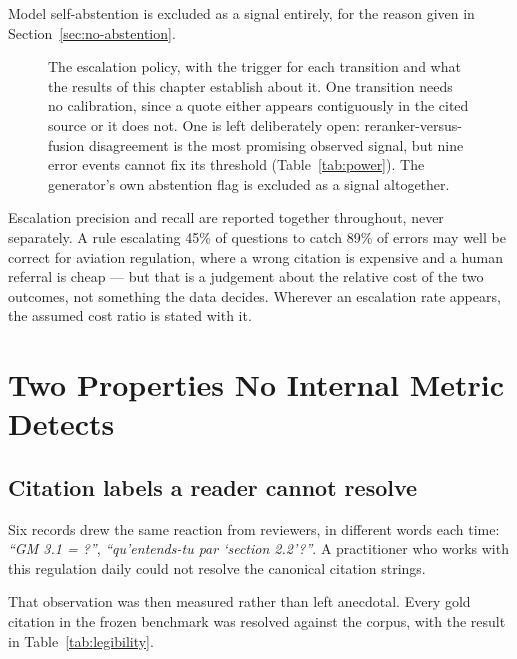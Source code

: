 Model self-abstention is excluded as a signal entirely, for the reason given in
Section~\ref{sec:no-abstention}.

\begin{figure}[htbp]
  \centering
  \resizebox{\textwidth}{!}{}
  \caption[The escalation policy and the status of each transition]{The
  escalation policy, with the trigger for each transition and what the results
  of this chapter establish about it. One transition needs no calibration, since
  a quote either appears contiguously in the cited source or it does not. One is
  left deliberately open: reranker-versus-fusion disagreement is the most
  promising observed signal, but nine error events cannot fix its threshold
  (Table~\ref{tab:power}). The generator's own abstention flag is excluded as a
  signal altogether.}
  \label{fig:escalation-policy}
\end{figure}

Escalation precision and recall are reported together throughout, never
separately. A rule escalating 45\% of questions to catch 89\% of errors may well
be correct for aviation regulation, where a wrong citation is expensive and a
human referral is cheap --- but that is a judgement about the relative cost of the
two outcomes, not something the data decides. Wherever an escalation rate appears,
the assumed cost ratio is stated with it.

\section{Two Properties No Internal Metric Detects}
\label{sec:invisible}

\subsection{Citation labels a reader cannot resolve}

Six records drew the same reaction from reviewers, in different words each time:
\emph{\enquote{GM 3.1 = ?}}, \emph{\enquote{qu'entends-tu par
\enquote{section 2.2}?}}. A practitioner who works with this regulation daily
could not resolve the canonical citation strings.

That observation was then measured rather than left anecdotal. Every gold citation
in the frozen benchmark was resolved against the corpus, with the result in
Table~\ref{tab:legibility}.

